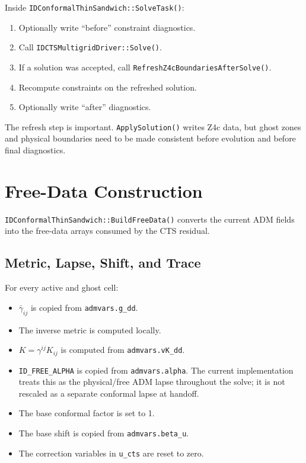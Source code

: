 \documentclass[11pt]{article}
\newcommand{\code}[1]{\texttt{#1}}
\begin{document}
Inside \code{IDConformalThinSandwich::SolveTask()}:
\begin{enumerate}
  \item Optionally write ``before'' constraint diagnostics.
  \item Call \code{IDCTSMultigridDriver::Solve()}.
  \item If a solution was accepted, call \code{RefreshZ4cBoundariesAfterSolve()}.
  \item Recompute constraints on the refreshed solution.
  \item Optionally write ``after'' diagnostics.
\end{enumerate}

The refresh step is important.  \code{ApplySolution()} writes Z4c data, but ghost
zones and physical boundaries need to be made consistent before evolution and
before final diagnostics.

\section{Free-Data Construction}

\code{IDConformalThinSandwich::BuildFreeData()} converts the current ADM fields
into the free-data arrays consumed by the CTS residual.

\subsection{Metric, Lapse, Shift, and Trace}

For every active and ghost cell:
\begin{itemize}
  \item \(\bar{\gamma}_{ij}\) is copied from \code{admvars.g\_dd}.
  \item The inverse metric is computed locally.
  \item \(K=\gamma^{ij}K_{ij}\) is computed from \code{admvars.vK\_dd}.
  \item \code{ID\_FREE\_ALPHA} is copied from \code{admvars.alpha}.  The current
        implementation treats this as the physical/free ADM lapse throughout the
        solve; it is not rescaled as a separate conformal lapse at handoff.
  \item The base conformal factor is set to 1.
  \item The base shift is copied from \code{admvars.beta\_u}.
  \item The correction variables in \code{u\_cts} are reset to zero.
\end{itemize}
\end{document}
